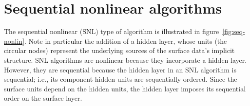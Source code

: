 

\section{Sequential nonlinear algorithms}
\label{subsec:seq-nonlin}
The sequential nonlinear (SNL) type of algorithm is illustrated in figure~\ref{fig:seq-nonlin}. 
Note in particular the addition of a hidden layer, whose units (the circular nodes)
represent the underlying sources of the surface data's implicit structure.
SNL algorithms are nonlinear because they incorporate a hidden layer.
However, they are sequential because the hidden layer in an SNL algorithm is sequential; i.e., its component hidden units
are sequentially ordered.
Since the surface units depend on the hidden units, the hidden layer imposes its sequential order on the surface layer. 

